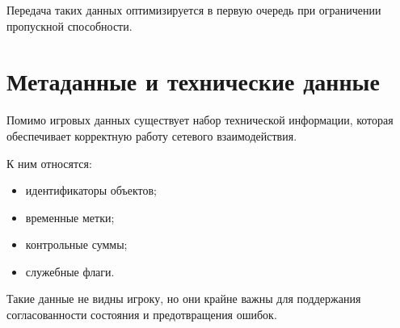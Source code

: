 Передача таких данных оптимизируется в первую очередь при ограничении пропускной способности.

\section{Метаданные и технические данные}

Помимо игровых данных существует набор технической информации, которая обеспечивает корректную работу сетевого
взаимодействия.

К ним относятся:
\begin{itemize}
    \item идентификаторы объектов;
    \item временные метки;
    \item контрольные суммы;
    \item служебные флаги.
\end{itemize}

Такие данные не видны игроку, но они крайне важны для поддержания согласованности состояния и предотвращения ошибок.

